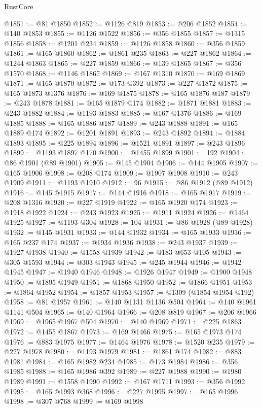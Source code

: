 \begin{lexlean}{RustCore}
\begin{coremodule}
@1851 := @81 @1850
@1852 := @1126 @819
@1853 := @206 @1852
@1854 := @140 @1853
@1855 := @1126 @1522
@1856 := @356 @1855
@1857 := @1315 @1856
@1858 := @1201 @234
@1859 := @1126 @1858
@1860 := @356 @1859
@1861 := @165 @1860
@1862 := @1861 @235
@1863 := @227 @1862
@1864 := @1244 @1863
@1865 := @227 @1859
@1866 := @139 @1865
@1867 := @356 @1570
@1868 := @1146 @1867
@1869 := @167 @1310
@1870 := @169 @1869
@1871 := @165 @1870
@1872 := @173 @392
@1873 := @227 @1872
@1875 := @165 @1873 @1376
@1876 := @169 @1875
@1878 := @165 @1876 @187
@1879 := @243 @1878
@1881 := @165 @1879 @174
@1882 := @1871 @1881
@1883 := @243 @1882
@1884 := @1193 @1883
@1885 := @167 @1376
@1886 := @169 @1885
@1888 := @165 @1886 @187
@1889 := @243 @1888
@1891 := @165 @1889 @174
@1892 := @1201 @1891
@1893 := @243 @1892
@1894 := @1884 @1893
@1895 := @225 @1894
@1896 := @1521 @1891
@1897 := @243 @1896
@1899 := @1193 @1897 @170
@1900 := @1455 @1899
@1901 := 192
@1904 := @86 @1901 (@89 @1901)
@1905 := @145 @1904
@1906 := @144 @1905
@1907 := @165 @1906
@1908 := @208 @174
@1909 := @1907 @1908
@1910 := @243 @1909
@1911 := @1193 @1910
@1912 := 96
@1915 := @86 @1912 (@89 @1912)
@1916 := @145 @1915
@1917 := @144 @1916
@1918 := @165 @1917
@1919 := @208 @1316
@1920 := @227 @1919
@1922 := @165 @1920 @174
@1923 := @1918 @1922
@1924 := @243 @1923
@1925 := @1911 @1924
@1926 := @1464 @1925
@1927 := @1193 @304
@1928 := 104
@1931 := @86 @1928 (@89 @1928)
@1932 := @145 @1931
@1933 := @144 @1932
@1934 := @165 @1933
@1936 := @165 @237 @174
@1937 := @1934 @1936
@1938 := @243 @1937
@1939 := @1927 @1938
@1940 := @1558 @1939
@1942 := @183 @653 @105
@1943 := @305 @1593
@1944 := @303 @1943
@1945 := @245 @1944
@1946 := @1942 @1945
@1947 := @1940 @1946
@1948 := @1926 @1947
@1949 := @1900 @1948
@1950 := @1895 @1949
@1951 := @1868 @1950
@1952 := @1866 @1951
@1953 := @1864 @1952
@1954 := @1857 @1953
@1957 := @1309 (@1854 @1954 @192)
@1958 := @81 @1957
@1961 := @140 @1131 @1136 @504
@1964 := @140 @1961 @1141 @504
@1965 := @140 @1964
@1966 := @208 @819
@1967 := @206 @1966
@1969 := @1965 @1967 @504
@1970 := @140 @1969
@1971 := @225 @1863
@1972 := @1455 @1867
@1973 := @169 @1466
@1975 := @165 @1973 @174
@1976 := @883 @1975
@1977 := @1464 @1976
@1978 := @1520 @235
@1979 := @227 @1978
@1980 := @1193 @1979
@1981 := @1861 @174
@1982 := @883 @1981
@1984 := @165 @1982 @234
@1985 := @173 @1984
@1986 := @356 @1985
@1988 := @165 @1986 @392
@1989 := @227 @1988
@1990 := @1980 @1989
@1991 := @1558 @1990
@1992 := @167 @1711
@1993 := @356 @1992
@1995 := @165 @1993 @368
@1996 := @227 @1995
@1997 := @165 @1996
@1998 := @307 @768
@1999 := @169 @1998

\end{coremodule}
\end{lexlean}
